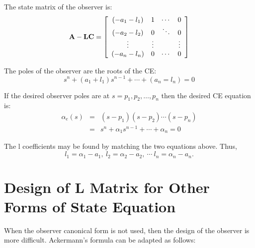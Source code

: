 The state matrix of the observer is:
\[
{\bf{A}} - {\bf{LC}} = \left[ {\begin{array}{*{20}c}
   {( - a_1  - l_1 )} & 1 &  \cdots  & 0  \\
   {( - a_2  - l_2 )} & 0 &  \ddots  & 0  \\
    \vdots  &  \vdots  & {} &  \vdots   \\
   {( - a_n  - l_n )} & 0 &  \cdots  & 0  \\
\end{array}} \right]
\]
 
 
The poles of the observer are the roots of the CE:
\[
s^n+(a_1+l_1)s^{n-1}+\cdots+(a_n=l_n)=0
\]
 

If the desired observer poles are at  $s=p_1,p_2,\ldots,p_n$ 
then the desired CE equation is:
\begin{eqnarray*}
	\alpha_e(s) & = & (s-p_1)(s-p_2)\cdots(s-p_n) \\
	            & = & s^n + \alpha_1s^{n-1} + \cdots + \alpha_n = 0
\end{eqnarray*}
 

The  l  coefficients may be found by matching the two equations above. 
Thus,
\[
l_1=\alpha_1-a_1,\ l_2=\alpha_2-a_2,\ \cdots\ l_n=\alpha_n-a_n.
\] 




\section*{Design of $\mathbf{L}$ Matrix for Other Forms of State Equation} %
\label{sec:design_of_l_matrix_for_other_forms_of_state_equation}


When the observer canonical form is not used, then the design of the observer is more difficult. Ackermann's formula can be adapted as follows:

